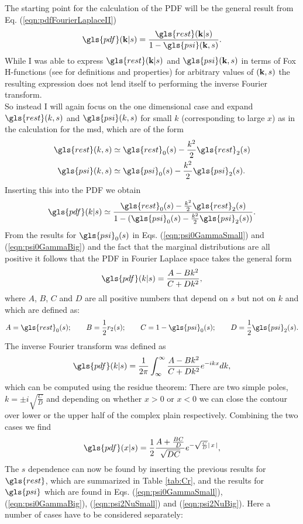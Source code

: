 The starting point for the calculation of the \gls{PDF} will be the general result from Eq. (\ref{eqn:pdfFourierLaplaceII})
%
\begin{align}
\gls{pdf}(\ve{k}|s) = \frac{ \gls{rest}(\ve{k}|s)}{1 - \gls{psi}(\ve{k},s)} .
\end{align}
%
While I was able to express $\gls{rest}(\ve{k}|s)$ and $\gls{psi}(\ve{k},s)$ in terms of Fox H-functions (see 
\cite{mathai2009} 
for definitions and properties) for arbitrary values of $(\mathbf{ k },s)$ the resulting expression does not lend itself to performing the inverse Fourier transform. \\
So instead I will again focus on the one dimensional case and expand $\gls{rest}(k,s)$ and $\gls{psi}(k,s)$ for small $k$ (corresponding to large $x$) as in the calculation for the \gls{msd}, which are of the form 
%
\begin{align}
\gls{rest}(k,s) \simeq & \; \gls{rest}_0(s) - \frac{k^2}{2}  \gls{rest}_2(s)  \\
\gls{psi}(k,s) \simeq & \; \gls{psi}_0(s) - \frac{k^2}{2}  \gls{psi}_2(s)  .
\end{align}
%
Inserting this into the \gls{PDF} we obtain
%
\begin{align}
\gls{pdf}(k|s) \simeq \frac{ \gls{rest}_0(s) - \frac{k^2}{2}  \gls{rest}_2(s)}{1 - (\gls{psi}_0(s) - \frac{k^2}{2}  \gls{psi}_2(s))} .
\end{align}
%
From the results for $\gls{psi}_0(s)$ in Eqs. (\ref{eqn:psi0GammaSmall}) and (\ref{eqn:psi0GammaBig}) and the fact that the marginal distributions are all positive it follows that the \gls{PDF} in Fourier Laplace space takes the general form 
%
\begin{align}
\gls{pdf}(k|s) = \frac{A- B k^2}{C+D k^2},
\end{align}
%
where $A$, $B$, $C$ and $D$ are all positive numbers that depend on $s$ but not on $k$ and which are defined as:
%
\begin{align}
A = \gls{rest}_0(s); \qquad B = \frac{1}{2} r_2(s); \qquad C = 1-\gls{psi}_0(s); \qquad D = \frac{1}{2} \gls{psi}_2(s) .
\end{align} 
%
The inverse Fourier transform was defined as
%
\begin{align}
\gls{pdf}(k|s) = \frac{1}{2\pi} \int^{\infty}_{\infty} \frac{A- B k^2}{C+D k^2} e^{-ikx} dk ,
\end{align}
%
which can be computed using the residue theorem: There are two simple poles, $k= \pm i \sqrt{\frac{C}{D}}$ and depending on whether $x > 0$ or $x<0$  we can close the contour over lower or the upper half of the complex plain respectively. Combining the two cases we find 
%
\begin{align}
\gls{pdf}(x|s) = \frac{1}{2}  \frac{A+ \frac{BC}{D} }{\sqrt{DC}} e^{-\sqrt{\frac{C}{D}} \abs{x}},
\end{align}
%
The $s$ dependence can now be found by inserting the previous results for $\gls{rest}$, which are summarized in Table \ref{tab:Cr}, and the results for $\gls{psi}$ which are found in Eqs. (\ref{eqn:psi0GammaSmall}), (\ref{eqn:psi0GammaBig}),  (\ref{eqn:psi2NuSmall}) and (\ref{eqn:psi2NuBig}). Here a number of cases have to be considered separately:

